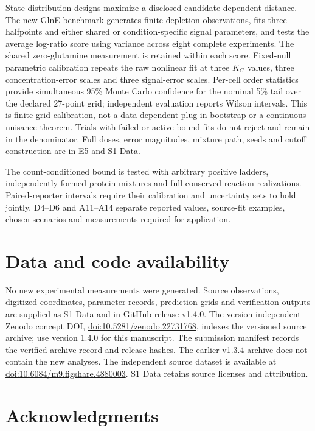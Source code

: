 \documentclass[10pt,letterpaper]{article}
\begin{document}
State-distribution designs maximize a disclosed candidate-dependent distance. The new GlnE benchmark generates finite-depletion observations, fits three halfpoints and either shared or condition-specific signal parameters, and tests the average log-ratio score using variance across eight complete experiments. The shared zero-glutamine measurement is retained within each score. Fixed-null parametric calibration repeats the raw nonlinear fit at three $K_G$ values, three concentration-error scales and three signal-error scales. Per-cell order statistics provide simultaneous 95\% Monte Carlo confidence for the nominal 5\% tail over the declared 27-point grid; independent evaluation reports Wilson intervals. This is finite-grid calibration, not a data-dependent plug-in bootstrap or a continuous-nuisance theorem. Trials with failed or active-bound fits do not reject and remain in the denominator. Full doses, error magnitudes, mixture path, seeds and cutoff construction are in E5 and S1 Data.

The count-conditioned bound is tested with arbitrary positive ladders, independently formed protein mixtures and full conserved reaction realizations. Paired-reporter intervals require their calibration and uncertainty sets to hold jointly. D4--D6 and A11--A14 separate reported values, source-fit examples, chosen scenarios and measurements required for application.

\section*{Data and code availability}

No new experimental measurements were generated. Source observations, digitized coordinates, parameter records, prediction grids and verification outputs are supplied as S1 Data and in \href{https://github.com/choeyule-gif/nitrogen-signaling-ultrasensitivity/releases/tag/v1.4.0}{GitHub release v1.4.0}. The version-independent Zenodo concept DOI, \href{https://doi.org/10.5281/zenodo.22731768}{doi:10.5281/zenodo.22731768}, indexes the versioned source archive; use version 1.4.0 for this manuscript. The submission manifest records the verified archive record and release hashes. The earlier v1.3.4 archive does not contain the new analyses. The independent source dataset is available at \href{https://doi.org/10.6084/m9.figshare.4880003}{doi:10.6084/m9.figshare.4880003}. S1 Data retains source licenses and attribution.

\section*{Acknowledgments}
\end{document}
